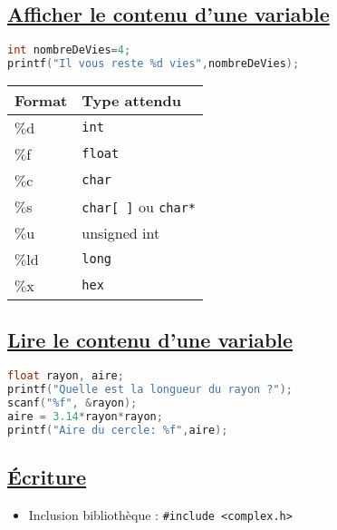 \documentclass[a3paper,12pt]{article}
\begin{document}
\begin{minipage}[t]{0.5\textwidth}
\begin{tcolorbox}[title=Variables, fonttitle=\large, top=0pt, bottom=3pt, boxsep=1pt, colback=white,
  colframe=palegreen, 
  colbacktitle=palegreen,
  coltitle=white,]
\vspace{0.5em}
\subsection*{{\small \underline{Afficher le contenu d'une variable }}}
\vspace{-0.5em}
\begin{lstlisting}[language=C,showstringspaces=false]
int nombreDeVies=4;
printf("Il vous reste %d vies",nombreDeVies);
\end{lstlisting}

\begin{tabular}{|l|p{4cm}|}
\hline
\textbf{Format} & \textbf{Type attendu}\\
\hline
$\%$d & \lstinline|int|\\
\hline
$\%$f & \lstinline|float|\\
\hline
$\%$c & \lstinline|char|\\
\hline
$\%$s & \lstinline|char[ ]| ou \lstinline|char*|\\
\hline
$\%$u & unsigned int\\
\hline
$\%$ld & \lstinline|long|\\
\hline
$\%$x & \lstinline|hex|\\
\hline
\end{tabular}
\vspace{-0.5em}
\subsection*{{\small \underline{Lire le contenu d'une variable }}}
\vspace{-0.5em}
\begin{lstlisting}[language=C,showstringspaces=false]
float rayon, aire;
printf("Quelle est la longueur du rayon ?");
scanf("%f", &rayon);
aire = 3.14*rayon*rayon;
printf("Aire du cercle: %f",aire);
\end{lstlisting}
\end{tcolorbox}

\begin{tcolorbox}[title=Nombres complexes, fonttitle=\large, top=0pt, bottom=5pt, boxsep=1pt, colback=white,
  colframe=turquoise, 
  colbacktitle=turquoise,
  coltitle=white,]
  
\vspace{0.5em}
\subsection*{{\small \underline{Écriture }}}
\begin{itemize}
\item Inclusion bibliothèque : \lstinline|#include <complex.h>|


\end{itemize}
\end{tcolorbox}
\end{minipage}
\end{document}
